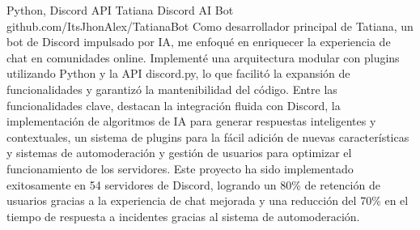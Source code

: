 \documentclass[9pt]{developercv}
\begin{document}
\begin{entrylist}
    \entry
		{Python, Discord API}
		{Tatiana Discord AI Bot}
		{github.com/ItsJhonAlex/TatianaBot}
		{Como desarrollador principal de Tatiana, un bot de Discord impulsado por IA, me enfoqué en enriquecer la experiencia de chat en comunidades online. Implementé una arquitectura modular con plugins utilizando Python y la API discord.py, lo que facilitó la expansión de funcionalidades y garantizó la mantenibilidad del código. Entre las funcionalidades clave, destacan la integración fluida con Discord, la implementación de algoritmos de IA para generar respuestas inteligentes y contextuales, un sistema de plugins para la fácil adición de nuevas características y sistemas de automoderación y gestión de usuarios para optimizar el funcionamiento de los servidores. Este proyecto ha sido implementado exitosamente en 54 servidores de Discord, logrando un 80\% de retención de usuarios gracias a la experiencia de chat mejorada y una reducción del 70\% en el tiempo de respuesta a incidentes gracias al sistema de automoderación.}

\end{entrylist}

\vspace{-10 pt}
\begin{entrylist}
   
\end{entrylist}
\end{document}

